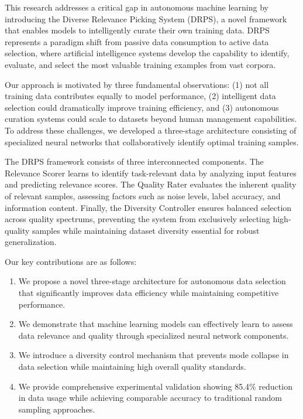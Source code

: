 \documentclass[12pt]{article}
\begin{document}
This research addresses a critical gap in autonomous machine learning by introducing the Diverse Relevance Picking System (DRPS), a novel framework that enables models to intelligently curate their own training data. DRPS represents a paradigm shift from passive data consumption to active data selection, where artificial intelligence systems develop the capability to identify, evaluate, and select the most valuable training examples from vast corpora.

Our approach is motivated by three fundamental observations: (1) not all training data contributes equally to model performance, (2) intelligent data selection could dramatically improve training efficiency, and (3) autonomous curation systems could scale to datasets beyond human management capabilities. To address these challenges, we developed a three-stage architecture consisting of specialized neural networks that collaboratively identify optimal training samples.

The DRPS framework consists of three interconnected components. The Relevance Scorer learns to identify task-relevant data by analyzing input features and predicting relevance scores. The Quality Rater evaluates the inherent quality of relevant samples, assessing factors such as noise levels, label accuracy, and information content. Finally, the Diversity Controller ensures balanced selection across quality spectrums, preventing the system from exclusively selecting high-quality samples while maintaining dataset diversity essential for robust generalization.

Our key contributions are as follows:
\begin{enumerate}
\item We propose a novel three-stage architecture for autonomous data selection that significantly improves data efficiency while maintaining competitive performance.
\item We demonstrate that machine learning models can effectively learn to assess data relevance and quality through specialized neural network components.
\item We introduce a diversity control mechanism that prevents mode collapse in data selection while maintaining high overall quality standards.
\item We provide comprehensive experimental validation showing 85.4\% reduction in data usage while achieving comparable accuracy to traditional random sampling approaches.
\end{enumerate}
\end{document}
